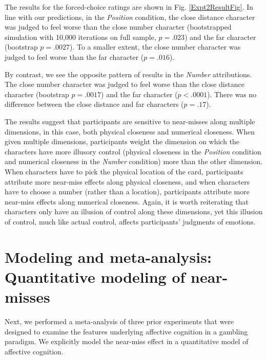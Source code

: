\documentclass[10pt,letterpaper]{article}
\begin{document}
The results for the forced-choice ratings are shown in Fig. \ref{Expt2ResultFig}. In line with our predictions, in the \textit{Position} condition, the close distance character was judged to feel worse than the close number character (bootstrapped simulation with 10,000 iterations on full sample, $p=.023$) and the far character (bootstrap $p=.0027$). To a smaller extent, the close number character was judged to feel worse than the far character ($p=.016$). 

By contrast, we see the opposite pattern of results in the \textit{Number} attributions. The close number character was judged to feel worse than the close distance character (bootstrap $p=.0017$) and the far character ($p<.0001$). There was no difference between the close distance and far characters ($p=.17$). 


The results suggest that participants are sensitive to near-misses along multiple dimensions, in this case, both physical closeness and numerical closeness. When given multiple dimensions, participants weight the dimension on which the characters have more illusory control (physical closeness in the \textit{Position} condition and numerical closeness in the \textit{Number} condition) more than the other dimension. When characters have to pick the physical location of the card, participants attribute more near-miss effects along physical closeness, and when characters have to choose a number (rather than a location), participants attribute more near-miss effects along numerical closeness. Again, it is worth reiterating that characters only have an illusion of control along these dimensions, yet this illusion of control, much like actual control, affects participants' judgments of emotions.








\section{Modeling and meta-analysis: Quantitative modeling of near-misses}
	Next, we performed a meta-analysis of three prior experiments that were designed to examine the features underlying affective cognition in a gambling paradigm. We explicitly model the near-miss effect in a quantitative model of affective cognition.
	
\end{document}
